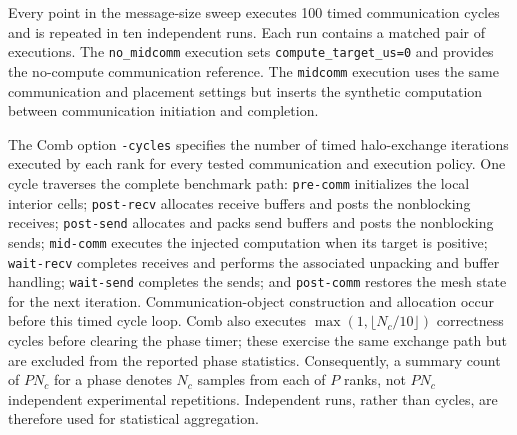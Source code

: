 Every point in the message-size sweep executes 100 timed communication cycles
and is repeated in ten independent runs. Each run contains a matched pair of
executions. The \texttt{no\_midcomm} execution sets
\texttt{compute\_target\_us=0} and provides the no-compute communication
reference. The
\texttt{midcomm} execution uses the same communication and placement settings
but inserts the synthetic computation between communication initiation and
completion.

The Comb option \texttt{-cycles} specifies the number of timed halo-exchange
iterations executed by each rank for every tested communication and execution
policy. One cycle traverses the complete benchmark path: \texttt{pre-comm}
initializes the local interior cells; \texttt{post-recv} allocates receive
buffers and posts the nonblocking receives; \texttt{post-send} allocates and
packs send buffers and posts the nonblocking sends; \texttt{mid-comm} executes
the injected computation when its target is positive; \texttt{wait-recv}
completes receives and performs the associated unpacking and buffer handling;
\texttt{wait-send} completes the sends; and \texttt{post-comm} restores the
mesh state for the next iteration. Communication-object construction and
allocation occur before this timed cycle loop. Comb also executes
$\max(1,\lfloor N_c/10\rfloor)$ correctness cycles before clearing the phase
timer; these exercise the same exchange path but are excluded from the reported
phase statistics. Consequently, a summary count of $P N_c$ for a phase denotes
$N_c$ samples from each of $P$ ranks, not $P N_c$ independent experimental
repetitions. Independent runs, rather than cycles, are therefore used for
statistical aggregation.

